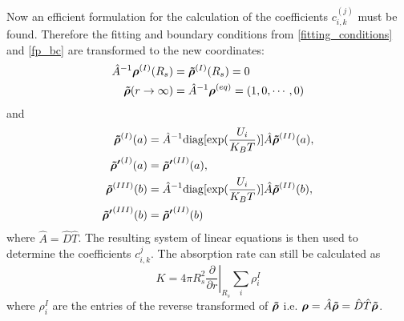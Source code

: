 Now an efficient formulation for the calculation of the coefficients $c_{i,k}^{(j)}$ must be found. Therefore the fitting and boundary conditions from \eqref{fitting_conditions} and \eqref{fp_bc} are transformed to the new coordinates:
\begin{align}
    \hat{A}^{-1}\boldsymbol{\mathbf{\rho}}^{(I)}(R_s) &= \boldsymbol{\mathbf{\tilde{\rho}}}^{(I)}(R_s) = 0 \nonumber \\
    \boldsymbol{\mathbf{\tilde{\rho}}}(r \rightarrow \infty) &= \hat{A}^{-1} \boldsymbol{\mathbf{\rho}}^{(eq)} = (1,0,\cdots,0)
\end{align}
and
\begin{align}
    \boldsymbol{\mathbf{\tilde{\rho}}}^{(I)}(a) &= \hat{A}^{-1}\mathrm{diag}[\exp(\frac{U_i}{K_B T})]\hat{A} \boldsymbol{\mathbf{\tilde{\rho}}}^{(II)}(a), \\ \nonumber
    \boldsymbol{\mathbf{\tilde{\rho} '}}^{(I)}(a) &= \boldsymbol{\mathbf{\tilde{\rho} '}}^{(II)}(a), \\ \nonumber
    \boldsymbol{\mathbf{\tilde{\rho}}}^{(III)}(b) &= \hat{A}^{-1}\mathrm{diag}[\exp(\frac{U_i}{K_B T})]\hat{A} \boldsymbol{\mathbf{\tilde{\rho}}}^{(II)}(b), \\ \nonumber
    \boldsymbol{\mathbf{\tilde{\rho} '}}^{(III)}(b) &= \boldsymbol{\mathbf{\tilde{\rho} '}}^{(II)}(b)
\end{align}
where $\hat{A} = \hat{D}\hat{T}$.
The resulting system of linear equations is then used to determine the coefficients $c_{i,k}^{j}$. The absorption rate can still be calculated as
\begin{equation}
    K = 4 \pi R_s^2 \left. \frac{\partial}{\partial r} \right|_{R_s} \sum_{i} \rho^{I}_{i}
\end{equation}
where $\rho^{I}_{i}$ are the entries of the reverse transformed of $\boldsymbol{\mathbf{\tilde{\rho}}}$ i.e. $\boldsymbol{\mathbf{\rho}} = \hat{A} \boldsymbol{\mathbf{\tilde{\rho}}} = \hat{D}\hat{T} \boldsymbol{\mathbf{\tilde{\rho}}}$.
